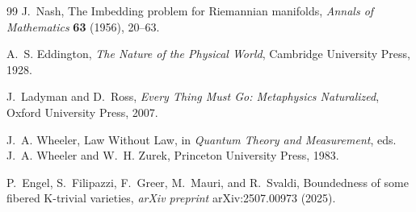 \documentclass[12pt, a4paper, oneside]{article}
\theoremstyle{plain}
\theoremstyle{definition}
\theoremstyle{remark}
\begin{document}
\begin{thebibliography}{99}
J.~Nash,
\newblock The Imbedding problem for Riemannian manifolds,
\newblock \emph{Annals of Mathematics} \textbf{63} (1956), 20--63.

A.~S. Eddington,
\newblock \emph{The Nature of the Physical World},
\newblock Cambridge University Press, 1928.

J.~Ladyman and D.~Ross,
\newblock \emph{Every Thing Must Go: Metaphysics Naturalized},
\newblock Oxford University Press, 2007.

J.~A. Wheeler,
\newblock Law Without Law,
\newblock in \emph{Quantum Theory and Measurement}, eds. J.~A. Wheeler and W.~H. Zurek, Princeton University Press, 1983.

P.~Engel, S.~Filipazzi, F.~Greer, M.~Mauri, and R.~Svaldi,
\newblock Boundedness of some fibered K-trivial varieties,
\newblock \emph{arXiv preprint} arXiv:2507.00973 (2025).

\end{thebibliography}
\end{document}
